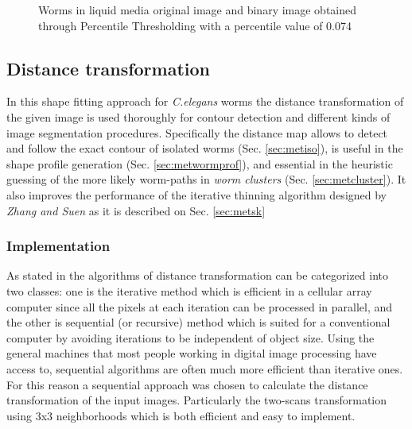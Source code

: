\begin{figure}[h t b p ! H]
  \centering
\qquad
\caption{Worms in liquid media original image and binary image obtained through
Percentile Thresholding with a percentile value of 0.074}
  \label{fig:wormthres}
\end{figure}

\subsection{Distance transformation}
\label{sec:metdt}

In this shape fitting approach for \emph{C.elegans} worms the distance transformation
of the given image is used thoroughly for contour detection and different kinds of image 
segmentation procedures. Specifically the distance map allows to detect and follow
the exact contour of isolated worms (Sec. \ref{sec:metiso}), 
is useful in the shape profile generation (Sec. \ref{sec:metwormprof}), and essential in the heuristic
guessing of the more likely worm-paths in \emph{worm clusters} (Sec. \ref{sec:metcluster}).
It also improves the performance of the iterative thinning algorithm designed by 
\emph{Zhang and Suen} \cite{thinning} as it is described on Sec. \ref{sec:metsk}

\subsubsection{Implementation}
\label{sec:dtimp}

 As stated in \cite[p.196]{fastdt} the algorithms of distance transformation can be categorized into two classes: one is the iterative 
 method which is efficient in a cellular array computer since all the pixels at each iteration can be processed in parallel, and the other 
is sequential (or recursive) method which is suited for a conventional computer by
 avoiding iterations to be independent of object size. 
Using the general machines that most people working in digital image processing
 have access to, sequential algorithms are often much more efficient than
 iterative ones. For this reason a sequential approach was chosen to calculate the
distance transformation of the input images. Particularly the two-scans transformation
using 3x3 neighborhoods \cite{fastdt} which is both efficient and easy to implement.\\

